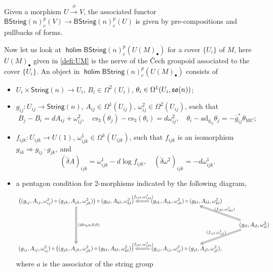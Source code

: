 \documentclass[letterpaper,10pt, oneside]{article} %
\newcommand{\bstringnp}{\mathsf{BString}(n)^p_{c}} %
\newcommand{\String}{\mathsf{String}}%
\DeclareMathOperator{\holim}{\mathsf{holim}}
\newcommand{\cs}{\mathrm{cs}}
\newcommand{\TM}{\theta_{\scriptscriptstyle \mathrm{MC}}}
\newcommand{\ad}{\mathrm{ad}}
\newcommand{\h}{\mathrm{h}}
\newcommand{\id}{\mathrm{id}}
\newcommand{\bg}{\bar{g}}
\begin{document}
Given a morphism $U\xrightarrow{\phi}V$, the associated functor
$\bstringnp(V)\to \bstringnp(U)$ is given by pre-compositions and
pullbacks of forms.


Now let us look at $ \holim \bstringnp ( U(M)_\bullet)$ for a cover
$\{U_i \}$ of $M$, here $U(M)_\bullet$ given in \eqref{defi:UM} is the nerve of the \v{C}ech groupoid associated
to the cover $\{U_i \}$. An object in $ \holim \bstringnp ( U(M)_\bullet)$
consists of
\begin{itemize}
\item $U_i \times \String(n) \to U_i$, $B_i \in \Omega^2(U_i)$,
  $\theta_i \in \Omega^1 (U_i, \mathfrak{so}(n))$;
\item $g_{ij}: U_{ij} \to \String(n)$, $A_{ij} \in \Omega^1(U_{ij})$,
  $\omega^2_{ij} \in \Omega^2(U_{ij})$, such
  that
\begin{equation}\label{eq:a-omega3-theta}
B_j - B_i= d A_{ij} +\omega_{ij}^2, \quad
\cs_3(\theta_j) - \cs_3(\theta_i) = d\omega_{ij}^2, \quad
\theta_i - \ad_{\bg_{ij}} \theta_j = - \bg^*_{ij} \TM;
\end{equation}
\item $f_{ijk}: U_{ijk} \to U(1)$, $\omega^1_{ijk} \in
  \Omega^1(U_{ijk})$, such that $f_{ijk}$ is an
  isomorphism $g_{ik}\Rightarrow g_{ij}\cdot g_{jk}$, and
\begin{equation}\label{eq:f-omega1}
(\check{\delta} A)_{ijk} =  \omega^1_{ijk} - d \log f_{ijk} , \quad
 (\check{\delta} \omega^2)_{ijk}=-d\omega^1_{ijk} .
\end{equation}
\item a pentagon condition for 2-morphisms indicated by the following diagram,
\begin{equation}\label{eq:pent}
\xymatrix{
\big( (g_{ij}, A_{ij}, \omega^2_{ij}) \circ (g_{jk}, A_{jk},
\omega^2_{jk} ) \big) \circ (g_{kl}, A_{kl}, \omega^2_{kl})
\ar@{=>}[dd]^{(\id\circ_\h a, 0, 0)} \ar@{<=}[r]^{\qquad\qquad(f_{ijk}, \omega^1_{ijk})}&
(g_{ik}, A_{ik}, \omega^2_{ik}) \circ (g_{kl}, A_{kl}, \omega^2_{kl}) \ar@{<=}[rd]^{(f_{ikl},
  \omega^1_{ikl}) }
\\
& & (g_{il}, A_{il}, \omega^2_{il}) \\
 (g_{ij}, A_{ij}, \omega^2_{ij}) \circ \big( (g_{jk}, A_{jk},
 \omega^2_{jk}) \circ (g_{kl}, A_{kl}, \omega^2_{kl}) \big) \ar@{<=}[r]^{\qquad\qquad(f_{jkl}, \omega^1_{jkl})}  &  (g_{ij}, A_{ij}, \omega^2_{ij}) \circ (g_{jl}, A_{jl},
 \omega^2_{jl}), \ar@{<=}[ru]^{(f_{ijl},
  \omega^1_{ijl}) } }
\end{equation}
where $a$ is the associator of the string group

\end{itemize}
\end{document}
